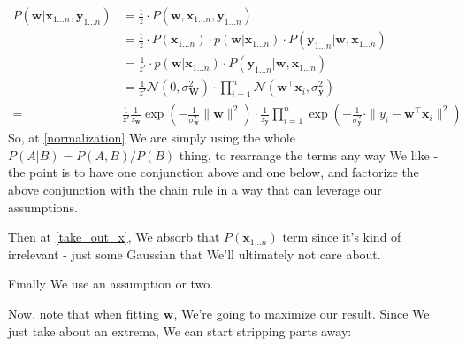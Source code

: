 \documentclass{article}
\begin{document}
		\begin{align}
			P(\mathbf{w}|\mathbf{x}_{1\ldots n}, \mathbf{y}_{1\ldots n}) &= \frac{1}{z}\cdot P(\mathbf{w}, \mathbf{x}_{1\ldots n}, \mathbf{y}_{1\ldots n})\label{normalization}\\
			 &= \frac{1}{z}\cdot P(\mathbf{x}_{1\ldots n})\cdot p(\mathbf{w}|\mathbf{x}_{1\ldots n})\cdot P(\mathbf{y}_{1\ldots n}|\mathbf{w}, \mathbf{x}_{1\ldots n})\\
			&= \frac{1}{z'}\cdot p(\mathbf{w}|\mathbf{x}_{1\ldots n})\cdot P(\mathbf{y}_{1\ldots n}|\mathbf{w}, \mathbf{x}_{1\ldots n})\label{take_out_x}\\
			&= \frac{1}{z'} \mathcal{N}(0, \sigma^2_{\mathbf{W}}) \cdot \prod^n_{i=1} \mathcal{N}(\mathbf{w}^\top\mathbf{x}_i, \sigma^2_{\mathbf{y}})\\
			=& \frac{1}{z'} \frac{1}{z_{\mathbf{w}}}\exp\left(-\frac{1}{\sigma^2_{\mathbf{w}}}\|\mathbf{w}\|^2 \right) \cdot \frac{1}{z_{\mathbf{y}}}\prod^n_{i=1} \exp\left(-\frac{1}{\sigma^2_{\mathbf{y}}}\cdot\|y_i - \mathbf{w}^\top\mathbf{x}_i \|^2\right)
		\end{align}
			So, at \ref{normalization} We are simply using the whole $P(A|B) = P(A, B)/P(B)$ thing, to rearrange the terms any way We like - the point is to have one conjunction above and one below, and factorize the above conjunction with the chain rule in a way that can leverage our assumptions.
			
			Then at \ref{take_out_x}, We absorb that $P(\mathbf{x}_{1\ldots n})$ term since it's kind of irrelevant - just some Gaussian that We'll ultimately not care about. 
			
			Finally We use an assumption or two. 
			
			Now, note that when fitting $\mathbf{w}$, We're going to maximize our result. Since We just take about an extrema, We can start stripping parts away:
			
\end{document}
